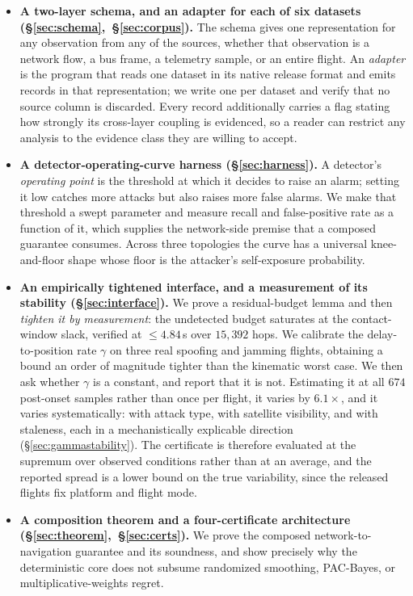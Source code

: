 \begin{itemize}
\item \textbf{A two-layer schema, and an adapter for each of six datasets
(\S\ref{sec:schema},~\S\ref{sec:corpus}).} The schema gives one representation
for any observation from any of the sources, whether that observation is a
network flow, a bus frame, a telemetry sample, or an entire flight. An
\emph{adapter} is the program that reads one dataset in its native release
format and emits records in that representation; we write one per dataset and
verify that no source column is discarded. Every record additionally carries a
flag stating how strongly its cross-layer coupling is evidenced, so a reader can
restrict any analysis to the evidence class they are willing to accept.

\item \textbf{A detector-operating-curve harness (\S\ref{sec:harness}).} A
detector's \emph{operating point} is the threshold at which it decides to raise
an alarm; setting it low catches more attacks but also raises more false alarms.
We make that threshold a swept parameter and measure recall and false-positive
rate as a function of it, which supplies the network-side premise that a
composed guarantee consumes. Across three topologies the curve has a universal
knee-and-floor shape whose floor is the attacker's self-exposure probability.

\item \textbf{An empirically tightened interface, and a measurement of its
stability (\S\ref{sec:interface}).} We prove a residual-budget lemma and then
\emph{tighten it by measurement}: the undetected budget saturates at the
contact-window slack, verified at $\le 4.84$\,s over $15{,}392$ hops. We
calibrate the delay-to-position rate $\gamma$ on three real spoofing and jamming
flights, obtaining a bound an order of magnitude tighter than the kinematic
worst case. We then ask whether $\gamma$ is a constant, and report that it is
not. Estimating it at all $674$ post-onset samples rather than once per
flight, it varies by $6.1\times$, and it varies systematically: with attack
type, with satellite visibility, and with staleness, each in a mechanistically
explicable direction (\S\ref{sec:gammastability}). The certificate is therefore
evaluated at the supremum over observed conditions rather than at an average,
and the reported spread is a lower bound on the true variability, since the
released flights fix platform and flight mode.

\item \textbf{A composition theorem and a four-certificate architecture
(\S\ref{sec:theorem},~\S\ref{sec:certs}).} We prove the composed
network-to-navigation guarantee and its soundness, and show precisely why the
deterministic core does not subsume randomized smoothing, PAC-Bayes, or
multiplicative-weights regret.


\end{itemize}
